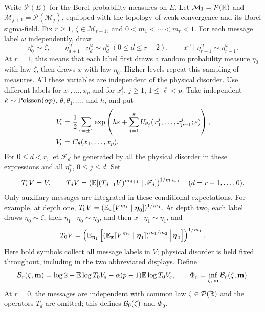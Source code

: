 Write $\mathcal P(E)$ for the Borel probability measures on $E$.
Let $\mathcal M_1=\mathcal P(\mathbb R)$ and
$\mathcal M_{j+1}=\mathcal P(\mathcal M_j)$, equipped with the topology of weak convergence and its Borel sigma-field. Fix $r\ge1$, $\zeta\in\mathcal M_{r+1}$, and
$0<m_1<\cdots<m_r<1$. For each message label $\omega$ independently, draw
\begin{equation}\label{model:chain}
 \eta_0^\omega\sim\zeta,\qquad
 \eta_{d+1}^\omega\mid\eta_d^\omega\sim\eta_d^\omega\ (0\le d\le r-2),
 \qquad x^\omega\mid\eta_{r-1}^\omega\sim\eta_{r-1}^\omega.
\end{equation}
At $r=1$, this means that each label first draws a random probability
measure $\eta_0$ with law $\zeta$, then draws $x$ with law $\eta_0$.
Higher levels repeat this sampling of measures. All these variables are
independent of the physical disorder. Use different
labels for $x_1,\ldots,x_p$ and for $x_\ell^j$, $j\ge1$, $1\le\ell<p$.
Take independent $k\sim\operatorname{Poisson}(\alpha p)$, $\theta,\theta_1,\ldots$, and $h$,
and put
\begin{align}
 V_{\rm s}&=\frac12\sum_{\varepsilon=\pm1}
 \exp\left(h\varepsilon+\sum_{j=1}^k
 U_{\theta_j}(x_1^j,\ldots,x_{p-1}^j;\varepsilon)\right),\label{model:vs}\\
 V_{\rm e}&=C_\theta(x_1,\ldots,x_p).\label{model:ve}
\end{align}
For $0\le d<r$, let $\mathscr F_d$ be generated by all the physical disorder in these
expressions and all $\eta_j^\omega$, $0\le j\le d$. Set
\begin{equation}\label{model:power-means}
 T_rV=V,\qquad
 T_dV=\left(\mathbb E[(T_{d+1}V)^{m_{d+1}}\mid\mathscr F_d]\right)^{1/m_{d+1}}
 \quad(d=r-1,\ldots,0).
\end{equation}
Only auxiliary messages are integrated in these conditional expectations.
For example, at depth one,
$T_0V=(\mathbb E_x[V^{m_1}\mid\boldsymbol\eta_0])^{1/m_1}$.
At depth two, each label draws
$\eta_0\sim\zeta$, then $\eta_1\mid\eta_0\sim\eta_0$, and then
$x\mid\eta_1\sim\eta_1$, and
\[
 T_0V=\left(\mathbb E_{\boldsymbol\eta_1}
   \left[\left(\mathbb E_{\boldsymbol x}
      [V^{m_2}\mid\boldsymbol\eta_1]\right)^{m_1/m_2}
      \,\middle|\,\boldsymbol\eta_0\right]\right)^{1/m_1}.
\]
Here bold symbols collect all message labels in $V$; physical disorder is
held fixed throughout, including in the two abbreviated displays.
Define
\begin{equation}\label{model:functional}
 \mathcal B_r(\zeta,\mathbf m)
 =\log2+\mathbb E\log T_0V_{\rm s}
 -\alpha(p-1)\mathbb E\log T_0V_{\rm e},
 \qquad \Phi_r=\inf_{\zeta,\,\mathbf m}\mathcal B_r(\zeta,\mathbf m).
\end{equation}
At $r=0$, the messages are independent with common law
$\zeta\in\mathcal P(\mathbb R)$ and the operators $T_d$ are omitted; this defines
$\mathcal B_0(\zeta)$ and $\Phi_0$.

